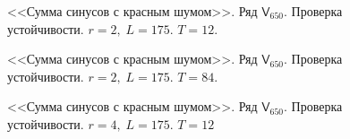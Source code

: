 \documentclass[specialist,
               substylefile = spbu.rtx,
               subf,href,colorlinks=true, 12p]{disser}
\begin{document}
\begin{figure}[h]
	\captionsetup{justification=centering}
	\caption{<<Сумма синусов с красным шумом>>. Ряд $\mathsf{V}_{650}$. Проверка устойчивости. $r = 2, \; L = 175$. $T = 12$.}
	\label{sigserrloopsr2.12}
\end{figure}

\begin{figure}[h]
	\captionsetup{justification=centering}
	\caption{<<Сумма синусов с красным шумом>>. Ряд $\mathsf{V}_{650}$. Проверка устойчивости. $r = 2, \; L = 175$. $T = 84$.}
	\label{sigserrloopsr2.84}
\end{figure}

\begin{figure}[h]
	\captionsetup{justification=centering}
	\caption{<<Сумма синусов с красным шумом>>. Ряд $\mathsf{V}_{650}$. Проверка устойчивости. $r = 4, \; L = 175$. $T = 12$}
	\label{sigserrloopsr4.12}
\end{figure}
\end{document}

